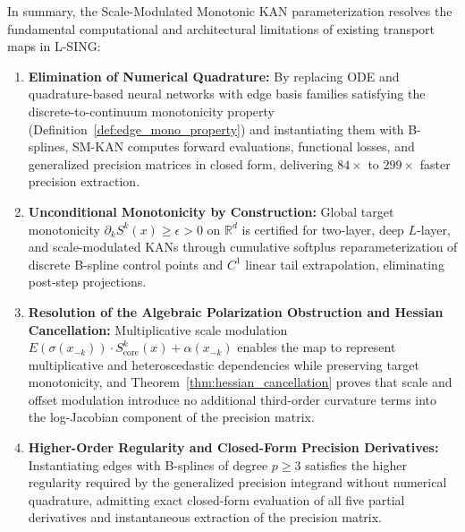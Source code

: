 \documentclass[11pt,a4paper]{article}
\theoremstyle{plain}
\theoremstyle{definition}
\theoremstyle{remark}
\begin{document}
In summary, the Scale-Modulated Monotonic KAN parameterization resolves the fundamental computational and architectural limitations of existing transport maps in L-SING:
\begin{enumerate}
    \item \textbf{Elimination of Numerical Quadrature:} By replacing ODE and quadrature-based neural networks with edge basis families satisfying the discrete-to-continuum monotonicity property (Definition~\ref{def:edge_mono_property}) and instantiating them with B-splines, SM-KAN computes forward evaluations, functional losses, and generalized precision matrices in closed form, delivering $84\times$ to $299\times$ faster precision extraction.
    \item \textbf{Unconditional Monotonicity by Construction:} Global target monotonicity $\partial_k S^k(x) \ge \epsilon > 0$ on $\mathbb{R}^d$ is certified for two-layer, deep $L$-layer, and scale-modulated KANs through cumulative softplus reparameterization of discrete B-spline control points and $C^1$ linear tail extrapolation, eliminating post-step projections.
    \item \textbf{Resolution of the Algebraic Polarization Obstruction and Hessian Cancellation:} Multiplicative scale modulation $E(\sigma(x_{-k})) \cdot S^k_{\text{core}}(x) + \alpha(x_{-k})$ enables the map to represent multiplicative and heteroscedastic dependencies while preserving target monotonicity, and Theorem~\ref{thm:hessian_cancellation} proves that scale and offset modulation introduce no additional third-order curvature terms into the log-Jacobian component of the precision matrix.
    \item \textbf{Higher-Order Regularity and Closed-Form Precision Derivatives:} Instantiating edges with B-splines of degree $p \ge 3$ satisfies the higher regularity required by the generalized precision integrand without numerical quadrature, admitting exact closed-form evaluation of all five partial derivatives and instantaneous extraction of the precision matrix.
\end{enumerate}
\end{document}

